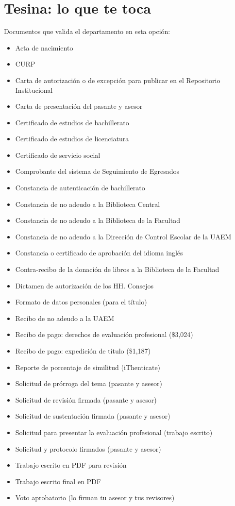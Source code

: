 \section{Tesina: lo que te toca}
Documentos que valida el departamento en esta opción:
\begin{itemize}
  \item Acta de nacimiento
  \item CURP
  \item Carta de autorización o de excepción para publicar en el Repositorio Institucional
  \item Carta de presentación del pasante y asesor
  \item Certificado de estudios de bachillerato
  \item Certificado de estudios de licenciatura
  \item Certificado de servicio social
  \item Comprobante del sistema de Seguimiento de Egresados
  \item Constancia de autenticación de bachillerato
  \item Constancia de no adeudo a la Biblioteca Central
  \item Constancia de no adeudo a la Biblioteca de la Facultad
  \item Constancia de no adeudo a la Dirección de Control Escolar de la UAEM
  \item Constancia o certificado de aprobación del idioma inglés
  \item Contra-recibo de la donación de libros a la Biblioteca de la Facultad
  \item Dictamen de autorización de los HH. Consejos
  \item Formato de datos personales (para el título)
  \item Recibo de no adeudo a la UAEM
  \item Recibo de pago: derechos de evaluación profesional (\$3,024)
  \item Recibo de pago: expedición de título (\$1,187)
  \item Reporte de porcentaje de similitud (iThenticate)
  \item Solicitud de prórroga del tema (pasante y asesor)
  \item Solicitud de revisión firmada (pasante y asesor)
  \item Solicitud de sustentación firmada (pasante y asesor)
  \item Solicitud para presentar la evaluación profesional (trabajo escrito)
  \item Solicitud y protocolo firmados (pasante y asesor)
  \item Trabajo escrito en PDF para revisión
  \item Trabajo escrito final en PDF
  \item Voto aprobatorio (lo firman tu asesor y tus revisores)
\end{itemize}
